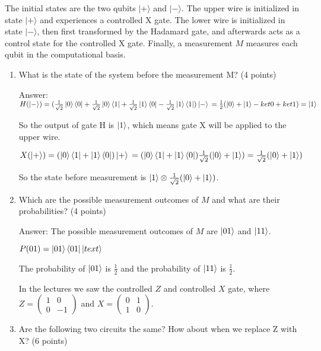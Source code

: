 \documentclass{article}
\begin{document}
The initial states are the two qubits $|+\rangle$ and $|-\rangle$. The upper wire is initialized in state $|+\rangle$ and experiences a controlled X gate. The lower wire is initialized in state $|-\rangle$, then first transformed by the Hadamard gate, and afterwards acts as a control state for the controlled X gate. Finally, a measurement $M$ measures each qubit in the computational basis.
\begin{enumerate}
    \item What is the state of the system before the measurement M? (4 points)

          Answer: $H(\ket{-})=(\frac{1}{\sqrt{2}}\ket{0}\bra{0}+\frac{1}{\sqrt{2}}\ket{0}\bra{1}+\frac{1}{\sqrt{2}}\ket{1}\bra{0}-\frac{1}{\sqrt{2}}\ket{1}\bra{1})\ket{-}
              \\=\frac{1}{2}(\ket{0}+\ket{1}-ket{0}+ket{1})
              \\=\ket{1}$

          So the output of gate H is $\ket{1}$, which means gate X will be applied to the upper wire.

          $X(\ket{+})=(\ket{0}\bra{1}+\ket{1}\bra{0})\ket{+}
              \\=(\ket{0}\bra{1}+\ket{1}\bra{0})\frac{1}{\sqrt{2}}(\ket{0}+\ket{1})
              \\=\frac{1}{\sqrt{2}}(\ket{0}+\ket{1})
          $

          So the state before measurement is $\ket{1} \otimes \frac{1}{\sqrt{2}}(\ket{0}+\ket{1})$.


    \item Which are the possible measurement outcomes of $M$ and what are their probabilities? (4 points)

          Answer: The possible measurement outcomes of $M$ are $\ket{01}$ and $\ket{11}$.

          $P(01)=\ket{01}\bra{01}\ket{text}$

          The probability of $\ket{01}$ is $\frac{1}{2}$ and the probability of $\ket{11}$ is $\frac{1}{2}$.



          In the lectures we saw the controlled $Z$ and controlled $X$ gate, where $Z = \begin{pmatrix} 1 & 0 \\ 0 & -1 \end{pmatrix}$ and $X = \begin{pmatrix} 0 & 1 \\ 1 & 0 \end{pmatrix}$.
    \item Are the following two circuits the same? How about when we replace Z with X? (6 points)

\end{enumerate}
\end{document}
